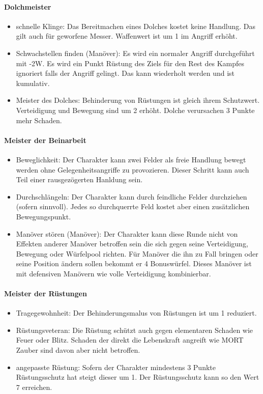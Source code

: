 \documentclass{article}
\begin{document}
\paragraph{Dolchmeister}

\begin{itemize}
\item schnelle Klinge: Das Bereitmachen eines Dolches kostet keine Handlung. Das gilt auch für geworfene Messer. Waffenwert ist um 1 im Angriff erhöht.
\item Schwachstellen finden (Manöver): Es wird ein normaler Angriff durchgeführt mit -2W. Es wird ein Punkt Rüstung des Ziels für den Rest des Kampfes ignoriert falls der Angriff gelingt. Das kann wiederholt werden und ist kumulativ.
\item Meister des Dolches: Behinderung von Rüstungen ist gleich ihrem Schutzwert. Verteidigung und Bewegung sind um 2 erhöht. Dolche verursachen 3 Punkte mehr Schaden.
\end{itemize}

\paragraph{Meister der Beinarbeit}

\begin{itemize}
\item Beweglichkeit: Der Charakter kann zwei Felder als freie Handlung bewegt werden ohne Gelegenheitsangriffe zu provozieren. Dieser Schritt kann auch Teil einer rausgezögerten Hanldung sein.
\item Durchschlängeln: Der Charakter kann durch feindliche Felder durchziehen (sofern sinnvoll). Jedes so durchquerrte Feld kostet aber einen zusätzlichen Bewegungspunkt.
\item Manöver stören (Manöver): Der Charakter kann diese Runde nicht von Effekten anderer Manöver betroffen sein die sich gegen seine Verteidigung, Bewegung oder Würfelpool richten. Für Manöver die ihn zu Fall bringen oder seine Position ändern sollen bekommt er 4 Bonuswürfel. Dieses Manöver ist mit defensiven Manövern wie volle Verteidigung kombinierbar.
\end{itemize}

\paragraph{Meister der Rüstungen}

\begin{itemize}
\item Tragegewohnheit: Der Behinderungsmalus von Rüstungen ist um 1 reduziert.
\item Rüstungsveteran: Die Rüstung schützt auch gegen elementaren Schaden wie Feuer oder Blitz. Schaden der direkt die Lebenskraft angreift wie MORT Zauber sind davon aber nicht betroffen.
\item angepasste Rüstung: Sofern der Charakter mindestens 3 Punkte Rüstungsschutz hat steigt dieser um 1. Der Rüstungsschutz kann so den Wert 7 erreichen.
\end{itemize}
\end{document}

